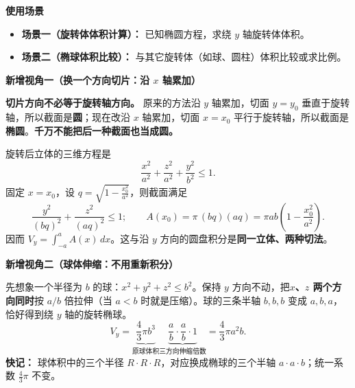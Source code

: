 \begin{explanationbox}
	\medskip
	\textbf{\textcolor{CExplanation}{使用场景}}
	\begin{itemize}[leftmargin=*, itemsep=0.5em, topsep=0.4em]
		\item \textbf{场景一（旋转体体积计算）：} 已知椭圆方程，求绕 $y$ 轴旋转体体积。
		\item \textbf{场景二（椭球体积比较）：} 与其它旋转体（如球、圆柱）体积比较或求比例。
	\end{itemize}


    \medskip
    \textbf{\textcolor{CExplanation}{新增视角一（换一个方向切片：沿 $x$ 轴累加）}}

    \textbf{切片方向不必等于旋转轴方向。} 原来的方法沿 $y$ 轴累加，切面 $y=y_0$ 垂直于旋转轴，所以截面是\textbf{圆}；现在改沿 $x$ 轴累加，切面 $x=x_0$ 平行于旋转轴，所以截面是\textbf{椭圆}。\textbf{千万不能把后一种截面也当成圆。}

    旋转后立体的三维方程是
    \[
      \frac{x^2}{a^2}+\frac{z^2}{a^2}+\frac{y^2}{b^2}\le 1.
    \]
    固定 $x=x_0$，设 $q=\sqrt{1-\frac{x_0^2}{a^2}}$，则截面满足
    \[
       \frac{y^2}{(bq)^2}+\frac{z^2}{(aq)^2}\le1;
       \qquad A(x_0)=\pi\,(bq)(aq)=\pi ab\left(1-\frac{x_0^2}{a^2}\right).
    \]
    因而 $V_y=\int_{-a}^{a}A(x)\,dx$。这与沿 $y$ 方向的圆盘积分是\textbf{同一立体、两种切法}。

    \begin{center}
      \resizebox{0.98\linewidth}{!}{}
    \end{center}
    \medskip
    \textbf{\textcolor{CExplanation}{新增视角二（球体伸缩：不用重新积分）}}

    先想象一个半径为 $b$ 的球：$x^2+y^2+z^2\le b^2$。保持 $y$ 方向不动，把\textbf{$x$、$z$ 两个方向同时}按 $a/b$ 倍拉伸（当 $a<b$ 时就是压缩）。球的三条半轴 $b,b,b$ 变成 $a,b,a$，恰好得到绕 $y$ 轴的旋转椭球。
    \[
       V_y=\underbrace{\frac43\pi b^3}_{\text{原球体积}}
       \underbrace{\frac ab\cdot\frac ab\cdot 1}_{\text{三方向伸缩倍数}}
       =\boxed{\frac43\pi a^2b}.
    \]
    \textbf{快记：} 球体积中的三个半径 $R\cdot R\cdot R$，对应换成椭球的三个半轴 $a\cdot a\cdot b$；统一系数 $\frac43\pi$ 不变。

\end{explanationbox}
